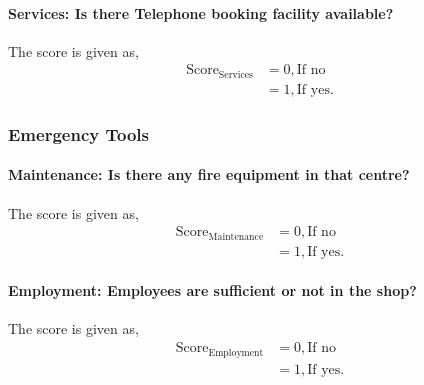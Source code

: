 \documentclass[oneside,twocolumn]{article}
\newcommand{\tsub}[2]{\text{#1}_{\text{#2}}}
\begin{document}
\paragraph{Services: Is there Telephone booking facility available?}

The score is given as,
\begin{align*}
\tsub{Score}{Services} &= 0, \text{If no} \\
        &= 1, \text{If yes}.
\end{align*}
\subsubsection{Emergency Tools}

\paragraph{Maintenance: Is there any fire equipment in that centre?}

The score is given as,
\begin{align*}
\tsub{Score}{Maintenance} &= 0, \text{If no} \\
        &= 1, \text{If yes}.
\end{align*}
\paragraph{Employment: Employees are sufficient or not in the shop?}

The score is given as,
\begin{align*}
\tsub{Score}{Employment} &= 0, \text{If no} \\
        &= 1, \text{If yes}.
\end{align*}
\end{document}
